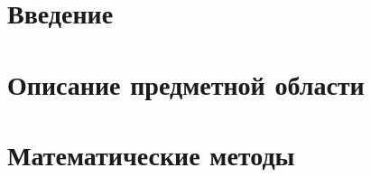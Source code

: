 \documentclass{fefu}
\author{Сластен Т.Д.}
\begin{document}

  \tableofcontents
  \pagebreak


  \section*{Введение}
  \section{Описание предметной области}
  
  \section{Математические методы}
  

\end{document}
